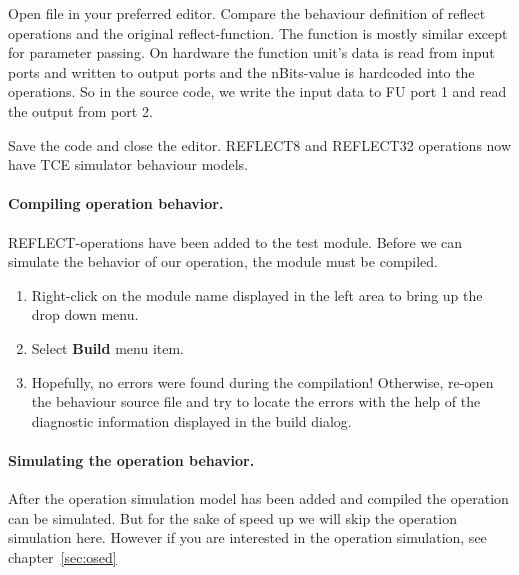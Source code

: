 \documentclass[twoside]{tceusermanual}
\begin{document}
Open file  in your preferred editor. Compare the behaviour definition
of reflect operations and the original reflect-function. The function is mostly
similar except for parameter passing. On hardware the function unit's data is read
from input ports and written to output ports and the nBits-value is hardcoded into
the operations. So in the source code, we write the input data to FU port 1 and
read the output from port 2.

Save the code and close the editor. REFLECT8 and REFLECT32 operations now have 
TCE simulator behaviour models.

\paragraph{Compiling operation behavior.} REFLECT-operations have been
added to the test module. Before we can simulate the behavior of our
operation, the module must be compiled.

\begin{enumerate}
\item%
  Right-click on the module name displayed in the left area to bring up the
  drop down menu.
\item%
  Select \textbf{Build} menu item. 
\item%
  Hopefully, no errors were found during the compilation! Otherwise, re-open
  the behaviour source file and try to locate the errors with the
  help of the diagnostic information displayed in the build dialog.
\end{enumerate}


\paragraph{Simulating the operation behavior.}
After the operation simulation model has been added and compiled the operation
can be simulated. But for the sake of speed up we will skip the operation
simulation here. However if you are interested in the operation simulation,
see chapter~\ref{sec:osed}
\end{document}
